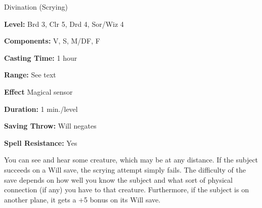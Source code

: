 
Divination (Scrying)

\textbf{Level:} Brd 3, Clr 5, Drd 4, Sor/Wiz 4

\textbf{Components:} V, S, M/DF, F

\textbf{Casting Time:} 1 hour

\textbf{Range:} See text

\textbf{Effect} Magical sensor

\textbf{Duration:} 1 min./level

\textbf{Saving Throw:} Will negates

\textbf{Spell Resistance:} Yes

You can see and hear some creature, which may be at any distance. If the subject 
succeeds on a Will save, the scrying attempt simply fails. The difficulty of the 
save depends on how well you know the subject and what sort of physical connection 
(if any) you have to that creature. Furthermore, if the subject is on another plane, 
it gets a +5 bonus on its Will save.

